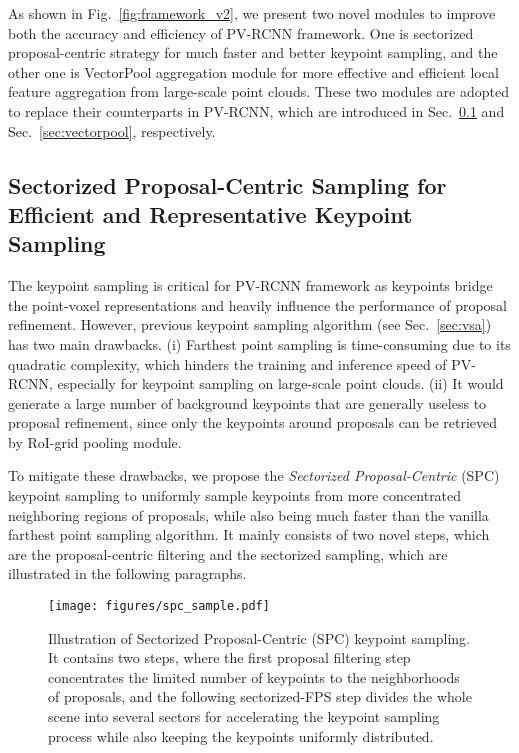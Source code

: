 \documentclass[natbib,twocolumn]{svjour3}          \smartqed  \usepackage{graphicx}
\begin{document}
As shown in Fig.~\ref{fig:framework_v2}, we present two novel modules to improve both the accuracy and efficiency of PV-RCNN framework. One is sectorized proposal-centric strategy for much faster and better keypoint sampling, and the other one is VectorPool aggregation module for more effective and efficient local feature aggregation from large-scale point clouds. 
These two modules are adopted to replace their counterparts in PV-RCNN, which are introduced in Sec.~\ref{sec:spc} and Sec.~\ref{sec:vectorpool}, respectively.



\subsection{Sectorized Proposal-Centric Sampling for Efficient and Representative Keypoint Sampling}\label{sec:spc}
The keypoint sampling is critical for PV-RCNN framework as keypoints bridge the point-voxel representations and heavily influence the performance of proposal refinement. 
However, previous keypoint sampling algorithm (see Sec.~\ref{sec:vsa}) has two main drawbacks. 
(i) Farthest point sampling is time-consuming due to its quadratic complexity, which hinders the training and inference speed of PV-RCNN, especially for keypoint sampling on large-scale point clouds.
(ii) 
It would generate a large number of background keypoints that are generally useless to proposal refinement, since only the keypoints around proposals can be retrieved by RoI-grid pooling module. 

To mitigate these drawbacks, we propose the \textit{Sectorized Proposal-Centric} (SPC) keypoint sampling to uniformly sample keypoints from more concentrated neighboring regions of proposals, while also being much faster than the vanilla farthest point sampling algorithm. 
It mainly consists of two novel steps, which are the proposal-centric filtering and the sectorized sampling, which are illustrated in the following paragraphs.  



\begin{figure*}
	\begin{center}
		\texttt{[image: figures/spc\_sample.pdf]}
	\end{center}
	\vspace{-4mm}
	\caption{Illustration of Sectorized Proposal-Centric (SPC) keypoint sampling. It contains two steps, where the first proposal filtering step concentrates the limited number of keypoints to the neighborhoods of proposals, and the following sectorized-FPS step divides the whole scene into several sectors for accelerating the keypoint sampling process while also keeping the keypoints uniformly distributed. }
	\label{fig:spc_draw}
\end{figure*}
\end{document}
